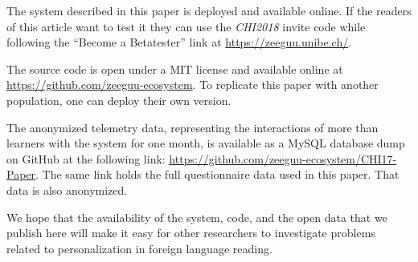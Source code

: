 The system described in this paper is deployed and available online. If the readers of this article want to test it they can use the {\em CHI2018} invite code while following the  ``Become a Betatester'' link at \url{https://zeeguu.unibe.ch/}.

The source code is open under a MIT license and available online at \url{https://github.com/zeeguu-ecosystem}. To replicate this paper with another population, one can deploy their own version.

The anonymized telemetry data, representing the interactions of more than \students learners with the system for one month, is available as a MySQL database dump on GitHub at the following link: \url{https://github.com/zeeguu-ecosystem/CHI17-Paper}. The same link holds the full questionnaire data used in this paper. That data is also anonymized. 

We hope that the availability of the system, code, and the open data that we publish here will make it easy for other researchers to investigate problems related to personalization in foreign language reading.
